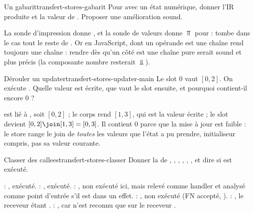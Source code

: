 \begin{exercice}{Un gabarit}{transfert-stores-gabarit}
  Pour  avec  un état numérique, donner
  l'IR produite et la valeur de . Proposer une amélioration sound.
\end{exercice}
\begin{solution}
  La sonde d'impression donne , et la
  sonde de valeurs donne $\Top$ pour  :  tombe dans le
  cas \og tout le reste\fg{} de \code{+}. Or en JavaScript, \code{+} dont
  un opérande est une chaîne rend toujours une chaîne : rendre
   dès qu'un côté est une chaîne pure serait sound et plus
  précis (la composante nombre resterait $\Bot$).
\end{solution}

\begin{exercice}{Dérouler un updater}{transfert-stores-updater-main}
  Le slot $0$ vaut $[0,2]$. On exécute . Quelle
  valeur est écrite, que vaut le slot ensuite, et pourquoi contient-il encore
  $0$ ?
\end{exercice}
\begin{solution}
   est lié à , soit $[0,2]$ ; le corps rend
  $[1,3]$, qui est la valeur écrite ; le slot devient
  $[0,2] \join [1,3] = [0,3]$. Il contient $0$ parce que la mise à jour est
  faible : le store range le join de \emph{toutes} les valeurs que l'état a
  pu prendre, initialiseur compris, pas sa valeur courante.
\end{solution}

\begin{exercice}{Classer des callees}{transfert-stores-classer}
  Donner la  de ,
  , ,
  , ,
  , et dire si  est exécuté.
\end{exercice}
\begin{solution}
   : , exécuté.  : ,
  exécuté.  : , non exécuté ici,
  mais relevé comme handler et analysé comme point d'entrée s'il est dans un
  effet.  : , non exécuté (FN accepté,
  ).  : , le receveur étant
  .  : , car  n'est
  reconnu que sur le receveur .
\end{solution}

